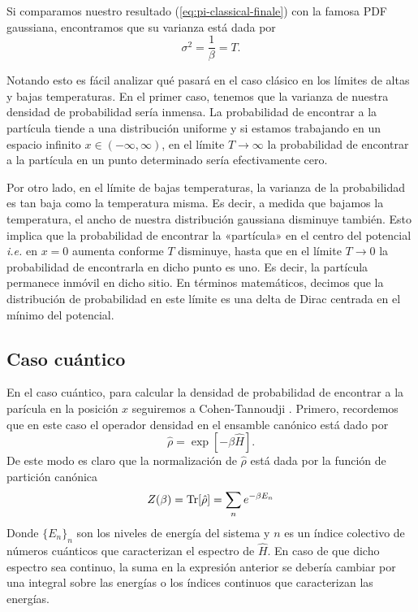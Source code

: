 \documentclass[%
 reprint,
 amsmath,amssymb,
 aps,
 pra,
]{revtex4-2}
\begin{document}
Si comparamos nuestro resultado (\ref{eq:pi-classical-finale}) con la famosa PDF gaussiana, encontramos que su varianza está dada por
\begin{equation}
\sigma^2 = \frac{1}{\beta} = T.
\end{equation}

Notando esto es fácil analizar qué pasará en el caso clásico en los límites de altas y bajas temperaturas. En el primer caso, tenemos que la varianza de nuestra densidad de probabilidad sería inmensa. La probabilidad de encontrar a la partícula tiende a una distribución uniforme y si estamos trabajando en un espacio infinito $x\in(-\infty,\infty)$, en el límite $T\rightarrow\infty$ la probabilidad de encontrar a la partícula en un punto determinado sería efectivamente cero.

Por otro lado, en el límite de bajas temperaturas, la varianza de la probabilidad es tan baja como la temperatura misma. Es decir, a medida que bajamos la temperatura, el ancho de nuestra distribución gaussiana disminuye también. Esto implica que la probabilidad de encontrar la «partícula» en el centro del potencial \textit{i.e.} en $x=0$ aumenta conforme $T$ disminuye, hasta que en el límite $T\rightarrow 0$ la probabilidad de encontrarla en dicho punto es uno. Es decir, la partícula permanece inmóvil en dicho sitio. En términos matemáticos, decimos que la distribución de probabilidad en este límite es una delta de Dirac centrada en el mínimo del potencial.

\subsection{Caso cuántico} \label{subsec:caso-cuantico}
En el caso cuántico, para calcular la densidad de probabilidad de encontrar a la parícula en la posición $x$ seguiremos a Cohen-Tannoudji \cite{Cohen-Tannoudji}. Primero, recordemos que en este caso el operador densidad en el ensamble canónico está dado por
\begin{equation}
\hat{\rho} = \exp[-\beta \hat{H}].
\end{equation}
De este modo es claro que la normalización de $\hat{\rho}$ está dada por la función de partición canónica
\begin{equation}
Z(\beta) = \Tr[\hat{\rho}]=\sum_n e^{-\beta E_n}\label{eq:Quantum-Z}
\end{equation} 
Donde $\{E_n\}_n$ son los niveles de energía del sistema y $n$ es un índice colectivo de números cuánticos que caracterizan el espectro de $\hat{H}$. En caso de que dicho espectro sea continuo, la suma en la expresión anterior se debería cambiar por una integral sobre las energías o los índices continuos que caracterizan las energías. 
\end{document}
